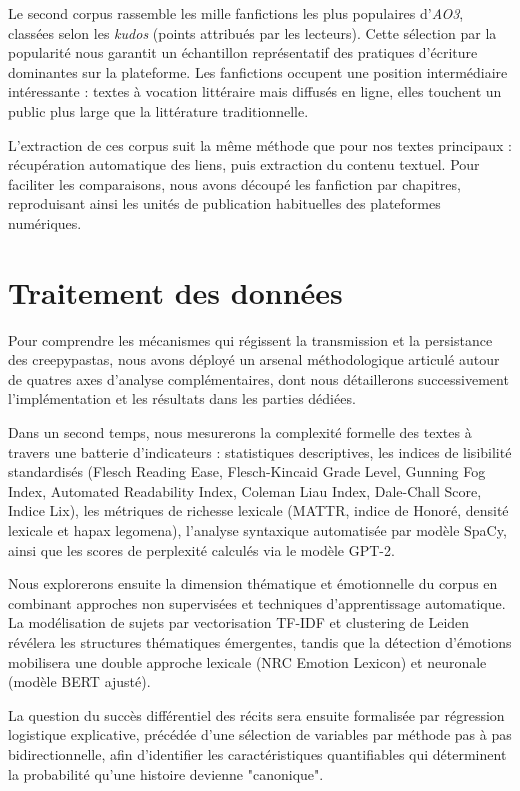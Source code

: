 \documentclass[12pt,a4paper,oneside,titlepage]{book} %
\begin{document}
Le second corpus rassemble les mille fanfictions les plus populaires d'\textit{AO3}, classées selon les \textit{kudos} (points attribués par les lecteurs). Cette sélection par la popularité nous garantit un échantillon représentatif des pratiques d'écriture dominantes sur la plateforme. Les fanfictions occupent une position intermédiaire intéressante : textes à vocation littéraire mais diffusés en ligne, elles touchent un public plus large que la littérature traditionnelle.

L'extraction de ces corpus suit la même méthode que pour nos textes principaux : récupération automatique des liens, puis extraction du contenu textuel. Pour faciliter les comparaisons, nous avons découpé les fanfiction par chapitres, reproduisant ainsi les unités de publication habituelles des plateformes numériques.


	
	\chapter{Traitement des données}


        Pour comprendre les mécanismes qui régissent la transmission et la persistance des creepypastas, nous avons déployé un arsenal méthodologique articulé autour de quatres axes d'analyse complémentaires, dont nous détaillerons successivement l'implémentation et les résultats dans les parties dédiées.

Dans un second temps, nous mesurerons la complexité formelle des textes à travers une batterie d'indicateurs : statistiques descriptives, les indices de lisibilité standardisés (Flesch Reading Ease, Flesch-Kincaid Grade Level, Gunning Fog Index, Automated Readability Index, Coleman Liau Index, Dale-Chall Score, Indice Lix), les métriques de richesse lexicale (MATTR, indice de Honoré, densité lexicale et hapax legomena), l'analyse syntaxique automatisée par modèle SpaCy, ainsi que les scores de perplexité calculés via le modèle GPT-2.

Nous explorerons ensuite la dimension thématique et émotionnelle du corpus en combinant approches non supervisées et techniques d'apprentissage automatique. La modélisation de sujets par vectorisation TF-IDF et clustering de Leiden révélera les structures thématiques émergentes, tandis que la détection d'émotions mobilisera une double approche lexicale (NRC Emotion Lexicon) et neuronale (modèle BERT ajusté).

La question du succès différentiel des récits sera ensuite formalisée par régression logistique explicative, précédée d'une sélection de variables par méthode pas à pas bidirectionnelle, afin d'identifier les caractéristiques quantifiables qui déterminent la probabilité qu'une histoire devienne "canonique".
\end{document}
